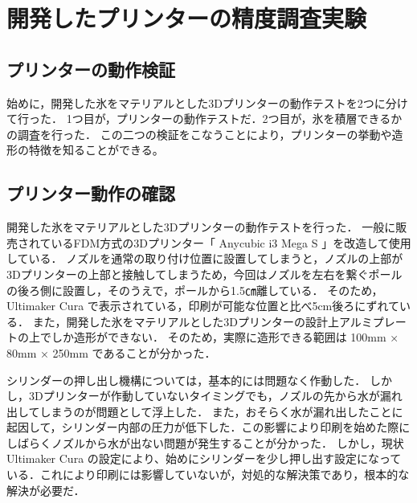 \chapter{開発したプリンターの精度調査実験}
\label{chp:first}

\section{プリンターの動作検証}
\label{sec:paragraph}
始めに，開発した氷をマテリアルとした3Dプリンターの動作テストを2つに分けて行った．
1つ目が，プリンターの動作テストだ．2つ目が，氷を積層できるかの調査を行った．
この二つの検証をこなうことにより，プリンターの挙動や造形の特徴を知ることができる。

\section{プリンター動作の確認}
\label{sec:paragraph}
開発した氷をマテリアルとした3Dプリンターの動作テストを行った．
一般に販売されているFDM方式の3Dプリンター「 Anycubic i3 Mega S 」を改造して使用している．
ノズルを通常の取り付け位置に設置してしまうと，ノズルの上部が3Dプリンターの上部と接触してしまうため，今回はノズルを左右を繋ぐポールの後ろ側に設置し，そのうえで，ポールから1.5㎝離している．
そのため， Ultimaker Cura で表示されている，印刷が可能な位置と比べ5cm後ろにずれている．
また，開発した氷をマテリアルとした3Dプリンターの設計上アルミプレートの上でしか造形ができない．
そのため，実際に造形できる範囲は 100mm × 80mm × 250mm であることが分かった．

シリンダーの押し出し機構については，基本的には問題なく作動した．
しかし，3Dプリンターが作動していないタイミングでも，ノズルの先から水が漏れ出してしまうのが問題として浮上した．
また，おそらく水が漏れ出したことに起因して，シリンダー内部の圧力が低下した．この影響により印刷を始めた際にしばらくノズルから水が出ない問題が発生することが分かった．
しかし，現状 Ultimaker Cura の設定により、始めにシリンダーを少し押し出す設定になっている．これにより印刷には影響していないが，対処的な解決策であり，根本的な解決が必要だ．


